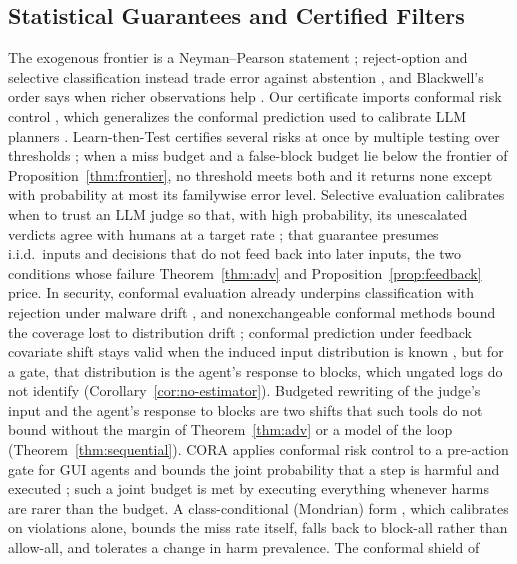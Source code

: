 \subsection{Statistical Guarantees and Certified Filters}
The exogenous frontier is a Neyman--Pearson statement
\citep{neyman1933problem,tong2018np}; reject-option and selective
classification instead trade error against abstention
\citep{chow1970optimum,geifman2017selective}, and Blackwell's order says when
richer observations help \citep{blackwell1953equivalent}. Our certificate
imports conformal risk control \citep{angelopoulos2024conformal}, which
generalizes the conformal prediction used to calibrate LLM planners
\citep{ren2023knowno,safepath2025}. Learn-then-Test certifies several risks at once by multiple
testing over thresholds \citep{angelopoulos2025ltt}; when a miss budget and a false-block budget
lie below the frontier of Proposition~\ref{thm:frontier}, no threshold meets both and it returns none
except with probability at most its familywise error level. Selective evaluation calibrates when to trust
an LLM judge so that, with high probability, its unescalated verdicts agree with humans at a
target rate \citep{jung2025trust}; that guarantee presumes i.i.d.\ inputs and decisions that
do not feed back into later inputs, the two conditions whose failure Theorem~\ref{thm:adv}
and Proposition~\ref{prop:feedback} price. In security, conformal evaluation already underpins classification with rejection
under malware drift \citep{barbero2022transcending}, and nonexchangeable conformal methods bound
the coverage lost to distribution drift \citep{barber2023beyond}; conformal prediction under
feedback covariate shift stays valid when the induced input distribution is known
\citep{fannjiang2022feedback}, but for a gate, that distribution is the agent's response to
blocks, which ungated logs do not identify (Corollary~\ref{cor:no-estimator}). Budgeted
rewriting of the
judge's input and the agent's response to blocks are two shifts that such tools do not bound
without the margin of Theorem~\ref{thm:adv} or a model of the loop
(Theorem~\ref{thm:sequential}).
CORA applies conformal risk control to a pre-action gate for GUI agents and bounds the joint
probability that a step is harmful and executed \citep{feng2026cora}; such a
joint budget is met by executing everything whenever harms are rarer than the
budget. A class-conditional (Mondrian) form \citep{vovk2005algorithmic}, which calibrates on
violations alone, bounds the miss rate itself, falls back to block-all rather than allow-all, and
tolerates a change in harm prevalence. The conformal shield of \citet{scarbro2025conformal}
